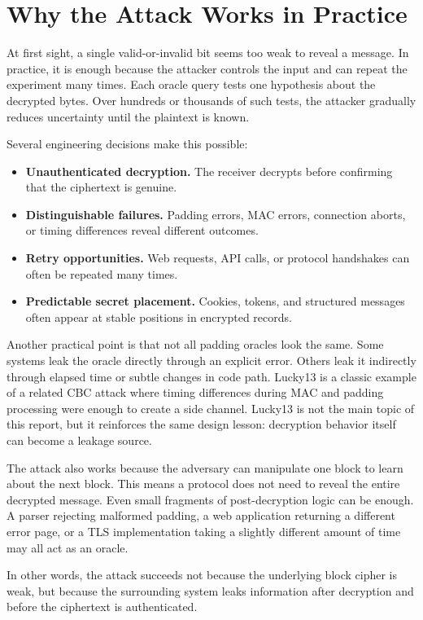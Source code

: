 \section{Why the Attack Works in Practice}

At first sight, a single valid-or-invalid bit seems too weak to reveal a message. In practice, it is enough because the attacker controls the input and can repeat the experiment many times. Each oracle query tests one hypothesis about the decrypted bytes. Over hundreds or thousands of such tests, the attacker gradually reduces uncertainty until the plaintext is known.

Several engineering decisions make this possible:

\begin{itemize}
    \item \textbf{Unauthenticated decryption.} The receiver decrypts before confirming that the ciphertext is genuine.
    \item \textbf{Distinguishable failures.} Padding errors, MAC errors, connection aborts, or timing differences reveal different outcomes.
    \item \textbf{Retry opportunities.} Web requests, API calls, or protocol handshakes can often be repeated many times.
    \item \textbf{Predictable secret placement.} Cookies, tokens, and structured messages often appear at stable positions in encrypted records.
\end{itemize}

Another practical point is that not all padding oracles look the same. Some systems leak the oracle directly through an explicit error. Others leak it indirectly through elapsed time or subtle changes in code path. Lucky13 is a classic example of a related CBC attack where timing differences during MAC and padding processing were enough to create a side channel. Lucky13 is not the main topic of this report, but it reinforces the same design lesson: decryption behavior itself can become a leakage source.

The attack also works because the adversary can manipulate one block to learn about the next block. This means a protocol does not need to reveal the entire decrypted message. Even small fragments of post-decryption logic can be enough. A parser rejecting malformed padding, a web application returning a different error page, or a TLS implementation taking a slightly different amount of time may all act as an oracle.

In other words, the attack succeeds not because the underlying block cipher is weak, but because the surrounding system leaks information after decryption and before the ciphertext is authenticated.
